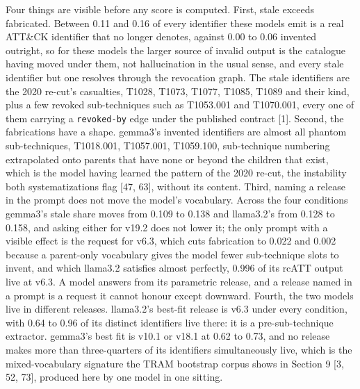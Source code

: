 \documentclass[11pt,a4paper]{article}
\begin{document}
Four things are visible before any score is computed. First, stale exceeds fabricated. Between 0.11 and 0.16 of every identifier these models emit is a real ATT\&CK identifier that no longer denotes, against 0.00 to 0.06 invented outright, so for these models the larger source of invalid output is the catalogue having moved under them, not hallucination in the usual sense, and every stale identifier but one resolves through the revocation graph. The stale identifiers are the 2020 re-cut's casualties, T1028, T1073, T1077, T1085, T1089 and their kind, plus a few revoked sub-techniques such as T1053.001 and T1070.001, every one of them carrying a \texttt{revoked-by} edge under the published contract [1]. Second, the fabrications have a shape. gemma3's invented identifiers are almost all phantom sub-techniques, T1018.001, T1057.001, T1059.100, sub-technique numbering extrapolated onto parents that have none or beyond the children that exist, which is the model having learned the pattern of the 2020 re-cut, the instability both systematizations flag [47, 63], without its content. Third, naming a release in the prompt does not move the model's vocabulary. Across the four conditions gemma3's stale share moves from 0.109 to 0.138 and llama3.2's from 0.128 to 0.158, and asking either for v19.2 does not lower it; the only prompt with a visible effect is the request for v6.3, which cuts fabrication to 0.022 and 0.002 because a parent-only vocabulary gives the model fewer sub-technique slots to invent, and which llama3.2 satisfies almost perfectly, 0.996 of its rcATT output live at v6.3. A model answers from its parametric release, and a release named in a prompt is a request it cannot honour except downward. Fourth, the two models live in different releases. llama3.2's best-fit release is v6.3 under every condition, with 0.64 to 0.96 of its distinct identifiers live there: it is a pre-sub-technique extractor. gemma3's best fit is v10.1 or v18.1 at 0.62 to 0.73, and no release makes more than three-quarters of its identifiers simultaneously live, which is the mixed-vocabulary signature the TRAM bootstrap corpus shows in Section 9 [3, 52, 73], produced here by one model in one sitting.
\end{document}
